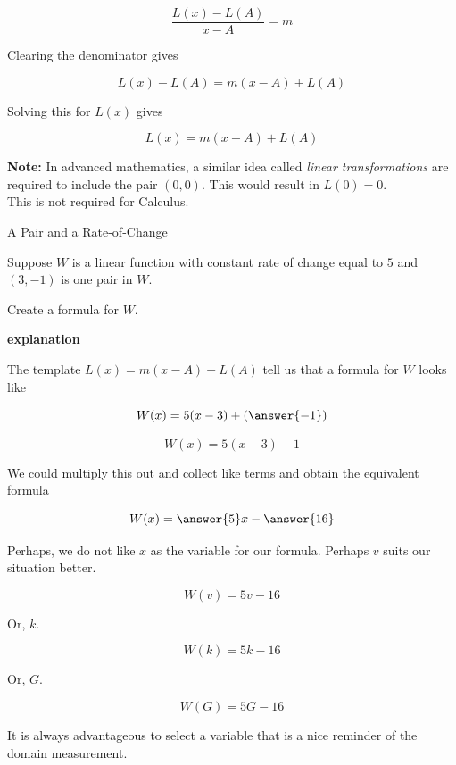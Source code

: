 \documentclass{ximera}
\begin{document}
\[  \frac{L(x) - L(A)}{x-A} = m \]


Clearing the denominator gives


\[  L(x) - L(A) = m (x-A) + L(A)     \]

Solving this for $L(x)$ gives

\[  L(x) = m (x-A) + L(A)     \]



\textbf{Note:} In advanced mathematics, a similar idea called \textit{linear transformations} are required to include the pair $(0,0)$.  This would result in $L(0) = 0$. \\  
This is not required for Calculus. 




\begin{example} A Pair and a Rate-of-Change


Suppose $W$ is a linear function with constant rate of change equal to $5$ and $(3, -1)$ is one pair in $W$.  

Create a formula for $W$.

\textbf{\textcolor{red!75!green}{explanation}} 



The template $L(x) = m (x-A) + L(A)$ tell us that a formula for $W$ looks like 


\[  W(x) = 5 (x-3) + \left(\answer{-1}\right)     \]


\[  W(x) = 5 (x-3) - 1     \]

We could multiply this out and collect like terms and obtain the equivalent formula


\[  W(x) = \answer{5}x - \answer{16}   \]



Perhaps, we do not like $x$ as the variable for our formula.  Perhaps $v$ suits our situation better.

\[  W(v) = 5v - 16   \]


Or, $k$.

\[  W(k) = 5k - 16   \]


Or, $G$.

\[  W(G) = 5G - 16   \]


It is always advantageous to select a variable that is a nice reminder of the domain measurement.

\end{example}
\end{document}
